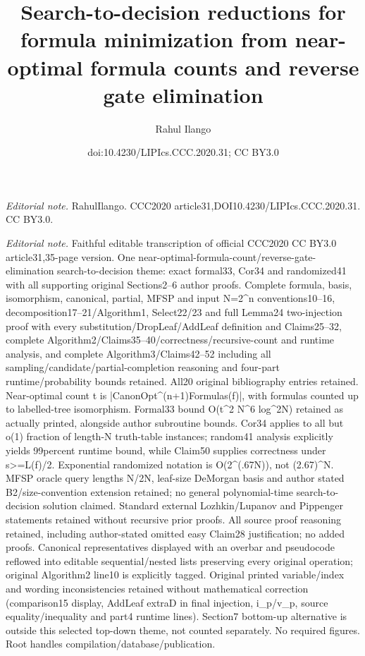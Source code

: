 \documentclass[10pt,a4paper]{article}
\title{Search-to-decision reductions for formula minimization from near-optimal formula counts and reverse gate elimination}
\author{Rahul Ilango}
\date{doi:10.4230/LIPIcs.CCC.2020.31; CC BY3.0}
\begin{document}
\maketitle
\noindent\textit{Editorial note.} RahulIlango. CCC2020 article31,DOI10.4230/LIPIcs.CCC.2020.31. CC BY3.0.\par\medskip
\noindent\textit{Editorial note.} Faithful editable transcription of official CCC2020 CC BY3.0 article31,35-page version. One near-optimal-formula-count/reverse-gate-elimination search-to-decision theme: exact formal33, Cor34 and randomized41 with all supporting original Sections2--6 author proofs. Complete formula, basis, isomorphism, canonical, partial, MFSP and input N=2\textasciicircum{}n conventions10--16, decomposition17--21/Algorithm1, Select22/23 and full Lemma24 two-injection proof with every substitution/DropLeaf/AddLeaf definition and Claims25--32, complete Algorithm2/Claims35--40/correctness/recursive-count and runtime analysis, and complete Algorithm3/Claims42--52 including all sampling/candidate/partial-completion reasoning and four-part runtime/probability bounds retained. All20 original bibliography entries retained. Near-optimal count t is |CanonOpt\textasciicircum{}(n+1)Formulas(f)|, with formulas counted up to labelled-tree isomorphism. Formal33 bound O(t\textasciicircum{}2 N\textasciicircum{}6 log\textasciicircum{}2N) retained as actually printed, alongside author subroutine bounds. Cor34 applies to all but o(1) fraction of length-N truth-table instances; random41 analysis explicitly yields 99percent runtime bound, while Claim50 supplies correctness under s>=L(f)/2. Exponential randomized notation is O(2\textasciicircum{}(.67N)), not (2.67)\textasciicircum{}N. MFSP oracle query lengths N/2N, leaf-size DeMorgan basis and author stated B2/size-convention extension retained; no general polynomial-time search-to-decision solution claimed. Standard external Lozhkin/Lupanov and Pippenger statements retained without recursive prior proofs. All source proof reasoning retained, including author-stated omitted easy Claim28 justification; no added proofs. Canonical representatives displayed with an overbar and pseudocode reflowed into editable sequential/nested lists preserving every original operation; original Algorithm2 line10 is explicitly tagged. Original printed variable/index and wording inconsistencies retained without mathematical correction (comparison15 display, AddLeaf extraD in final injection, i\_p/v\_p, source equality/inequality and part4 runtime lines). Section7 bottom-up alternative is outside this selected top-down theme, not counted separately. No required figures. Root handles compilation/database/publication.\par\medskip
\end{document}

